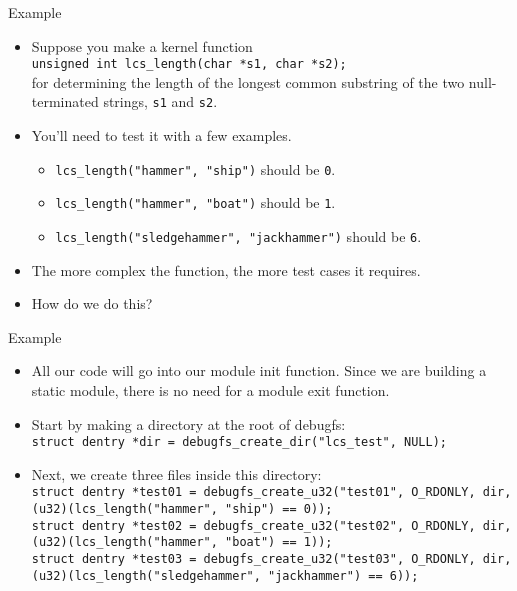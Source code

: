 \documentclass{beamer}
\begin{document}
\begin{frame}{Example}
  \begin{itemize}
  \item Suppose you make a kernel function\\
    \texttt{unsigned int lcs\_length(char *s1, char *s2);}\\
    for determining the length of the longest common substring of
    the two null-terminated strings, \texttt{s1} and \texttt{s2}.
  \item You'll need to test it with a few examples.
    \begin{itemize}
    \item \texttt{lcs\_length("hammer", "ship")} should be \texttt{0}.
    \item \texttt{lcs\_length("hammer", "boat")} should be \texttt{1}.
    \item \texttt{lcs\_length("sledgehammer", "jackhammer")} should be \texttt{6}.
    \end{itemize}
  \item The more complex the function, the more test cases it
    requires.
  \item How do we do this?
  \end{itemize}
\end{frame}

\begin{frame}{Example}
  \begin{itemize}
  \item All our code will go into our module init function. Since we
    are building a static module, there is no need for a module exit
    function.
  \item Start by making a directory at the root of debugfs:\\
    \texttt{struct dentry *dir = debugfs\_create\_dir("lcs\_test", NULL);}
  \item Next, we create three files inside this directory:\\
    \texttt{struct dentry *test01 = debugfs\_create\_u32("test01",
      O\_RDONLY, dir, (u32)(lcs\_length("hammer", "ship") == 0));}\\
    \texttt{struct dentry *test02 = debugfs\_create\_u32("test02",
      O\_RDONLY, dir, (u32)(lcs\_length("hammer", "boat") == 1));}\\
    \texttt{struct dentry *test03 = debugfs\_create\_u32("test03",
      O\_RDONLY, dir, (u32)(lcs\_length("sledgehammer", "jackhammer") == 6));}
  \end{itemize}
\end{frame}
\end{document}
